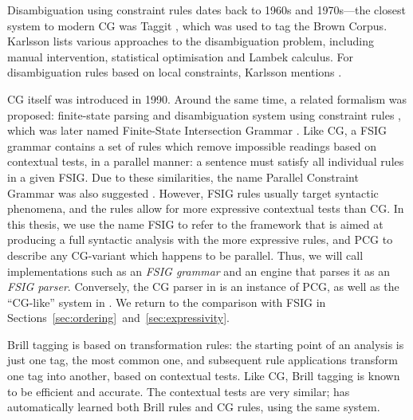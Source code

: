 Disambiguation using constraint rules dates back to 1960s and 1970s---the closest system to modern CG was Taggit \cite{taggit}, which was used to tag the Brown Corpus.
Karlsson \cite{karlsson1995constraint} lists various approaches to the disambiguation 
problem, including manual intervention, statistical optimisation and Lambek calculus.
For disambiguation rules based on local constraints, Karlsson mentions \cite{hindle1989disamrules,herz1991local}.


CG itself was introduced in 1990. Around the same time, a related formalism was proposed: 
finite-state parsing and disambiguation system using constraint rules \cite{koskenniemi90}, which was later named Finite-State Intersection Grammar \cite{piitulainen1995}. 
Like CG, a FSIG grammar contains a set of rules which remove impossible readings based on contextual tests, 
in a parallel manner: a sentence must satisfy all individual rules in a given FSIG. 
Due to these similarities, the name Parallel Constraint Grammar was also suggested \cite{koskenniemi97}.
However, FSIG rules usually target syntactic phenomena, and the rules allow for more expressive contextual tests than CG. 
In this thesis, we use the name FSIG to refer to the framework that is aimed at producing a full syntactic analysis with the more expressive rules, 
and PCG to describe any CG-variant which happens to be parallel.
Thus, we will call implementations such as \cite{voutilainen1994designing} an \emph{FSIG grammar} and an engine that parses it as an \emph{FSIG parser}.
Conversely, the CG parser in \cite{listenmaa_claessen2015} is an instance of PCG, 
as well as the ``CG-like'' system in \cite{lager98}.
We return to the comparison with FSIG in Sections~\ref{sec:ordering}~and~\ref{sec:expressivity}.


Brill tagging \cite{brill1995} is based on transformation rules: the starting point of 
an analysis is just one tag, the most common one, and subsequent rule applications transform 
one tag into another, based on contextual tests. 
Like CG, Brill tagging is known to be efficient and accurate. The contextual tests are very similar; \cite{lager01transformation} 
has automatically learned both Brill rules and CG rules, using the same system.

